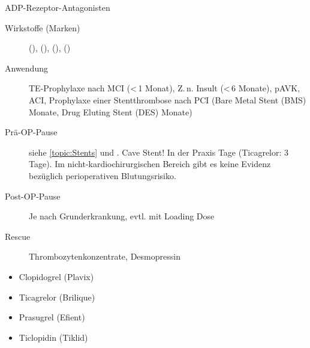 \TextSlide
{ADP-Rezeptor-Antagonisten}
{
\begin{description}
  \item[Wirkstoffe (Marken)] 
  (), 
  (), 
  (), 
  ()
  \item[Anwendung] TE-Prophylaxe nach MCI (<\,1 Monat),
  Z.\,n. Insult (<\,6 Monate), pAVK, ACI, Prophylaxe einer
  Stentthrombose nach PCI (Bare Metal Stent (BMS)
   Monate, Drug Eluting Stent (DES)
  Monate)
  \item[Prä-OP-Pause] siehe \ref{topic:Stents}
  und . Cave Stent! In der Praxis
   Tage (Ticagrelor: 3 Tage). Im
  nicht-kardiochirurgischen Bereich gibt es keine Evidenz bezüglich perioperativen Blutungsrisiko.
  \item[Post-OP-Pause] Je nach Grunderkrankung, evtl. mit
  Loading Dose
  \item[Rescue] Thrombozytenkonzentrate, Desmopressin
\end{description}

}
{
\begin{itemize}
  \item Clopidogrel (Plavix{\texttrademark})
  \item {Ticagrelor}
  ({Brilique\texttrademark})
  \item {Prasugrel}
  ({Efient\texttrademark})
  \item Ticlopidin
  (Tiklid{\texttrademark})
\end{itemize}
}
{}
{}
{}




